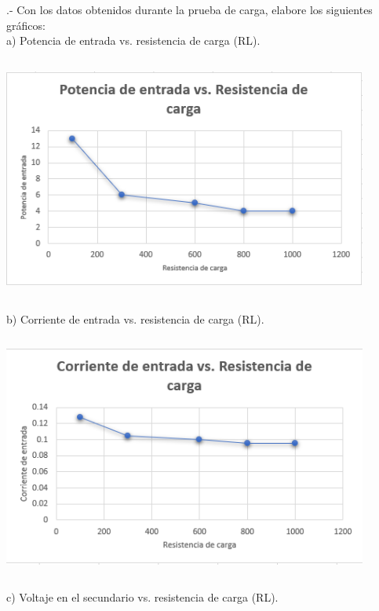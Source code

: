 \documentclass[12pt]{article}
\begin{document}
	.- Con los datos obtenidos durante la prueba de carga, elabore los siguientes gráficos:\\
	
	a) Potencia de entrada vs. resistencia de carga (RL).\\
	
	\begin{center}
		\includegraphics[width=12cm,height=8cm]{Img/grafo1}\\
	\end{center}
	
	b) Corriente de entrada vs. resistencia de carga (RL).\\
	
	\begin{center}
		\includegraphics[width=12cm,height=8cm]{Img/grafo2}\\
	\end{center}
	
	c) Voltaje en el secundario vs. resistencia de carga (RL).\\
	
\end{document}
